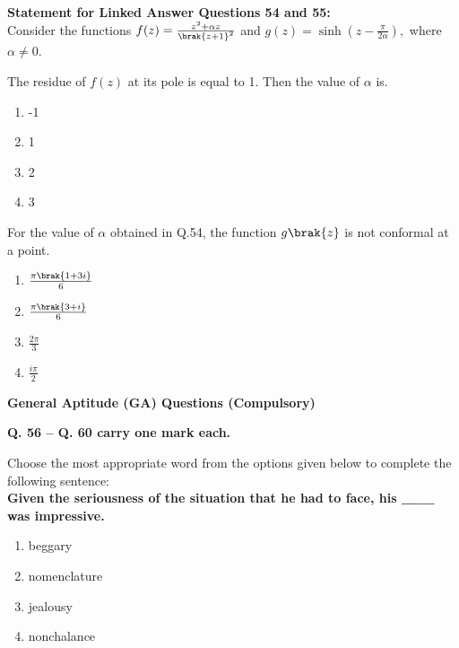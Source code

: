 \item[]{
 \textbf{Statement for Linked Answer Questions 54 and 55:}\\
 Consider the functions
 $
 f(z) = \frac{z^2 + \alpha z}{\brak{z+1}^2}
 $
 and
 $
 g(z) = \sinh(z - \frac{{\pi}}{{2\alpha}}),
 $
 where $\alpha \neq 0$.}
    \item{
            The residue of $f(z)$ at its pole is equal to 1. Then the value of $\alpha$ is.
                
            \begin{multicols}{4}
                \begin{enumerate}
                    \item -1
                    \item 1
                    \item 2
                    \item 3
                \end{enumerate}
            \end{multicols}
        }
	\item{
        	
        	For the value of $\alpha$ obtained in Q.54, the function $g\brak{z}$ is not conformal at a point.
        	\hfill
        	
        	\begin{multicols}{4}
        		\begin{enumerate}
        			\item $\frac{\pi\brak{1+3i}}{6}$
        			\item $\frac{\pi\brak{3+i}}{6}$  
        			\item $\frac{2\pi}{3}$
        			\item $\frac{i\pi}{2}$
        		\end{enumerate}
        	\end{multicols}
      }
\item[]{
\textbf{General Aptitude (GA) Questions (Compulsory)}

\textbf{Q. 56 – Q. 60 carry one mark each.}\\}
        \item {Choose the most appropriate word from the options given below to complete the following
    sentence: \\ \textbf{
    Given the seriousness of the situation that he had to face, his \_\_\_ was impressive.} \\ 
    \begin{multicols}{4}
    	\begin{enumerate}
    		\item beggary 
    		\item nomenclature
    		\item jealousy
    		\item nonchalance
    	\end{enumerate}
    \end{multicols}}
    

